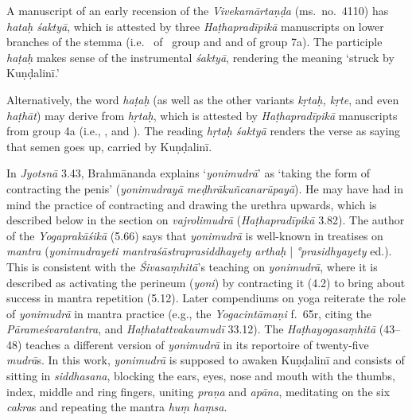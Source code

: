 \begin{ekdosis}
\begin{philcomm}[hp03_040]
A manuscript of an early recension of the \emph{Vivekamārtaṇḍa} (ms.~no.~4110) has \emph{hataḥ śaktyā}, which is attested by three \emph{Haṭhapradīpikā} manuscripts on lower branches of the stemma (i.e.~ of \textdelta\ group and  and  of group 7a). The participle \emph{haṭaḥ} makes sense of the instrumental \emph{śaktyā}, rendering the meaning `struck by Kuṇḍalinī.' 

Alternatively, the word \emph{haṭaḥ} (as well as the other variants \emph{kṛtaḥ, kṛte}, and even \emph{haṭhāt}) may derive from \emph{hṛtaḥ}, which is attested by \emph{Haṭhapradīpikā} manuscripts from group 4a (i.e., ,  and ). The reading \emph{hṛtaḥ śaktyā} renders the verse as saying that semen goes up, carried by Kuṇḍalinī. 





%



In \emph{Jyotsnā} 3.43, Brahmānanda explains `\emph{yonimudrā}' as `taking the form of contracting the penis' (\emph{yonimudrayā meḍhrākuñcanarūpayā}). He may have had in mind the practice of contracting and drawing the urethra upwards, which is described below in the section on \emph{vajrolimudrā} (\emph{Haṭhapradīpikā} 3.82). The author of the \emph{Yogaprakāśikā} (5.66) says that \emph{yonimudrā} is well-known in treatises on \emph{mantra} (\emph{yonimudrayeti mantraśāstraprasiddhayety arthaḥ} | \emph{°prasidhyayety} ed.). This is consistent with the \emph{Śivasaṃhitā}'s teaching on \emph{yonimudrā}, where it is described as activating the perineum (\emph{yoni}) by contracting it (4.2) to bring about success in mantra repetition (5.12). Later compendiums on yoga reiterate the role of \emph{yonimudrā} in mantra practice (e.g., the \emph{Yogacintāmaṇi} f.~65r, citing the \emph{Pārameśvaratantra}, and \emph{Haṭhatattvakaumudī} 33.12). The \emph{Haṭhayogasaṃhitā} (43–48) teaches a different version of \emph{yonimudrā} in its reportoire of twenty-five \emph{mudrā}s. In this work, \emph{yonimudrā} is supposed to awaken Kuṇḍalinī and consists of sitting in \emph{siddhasana}, blocking the ears, eyes, nose and mouth with the thumbs, index, middle and ring fingers, uniting \emph{praṇa} and \emph{apāna}, meditating on the six \emph{cakra}s and repeating the mantra \emph{huṃ haṃsa}. 


\end{philcomm}
\end{ekdosis}
